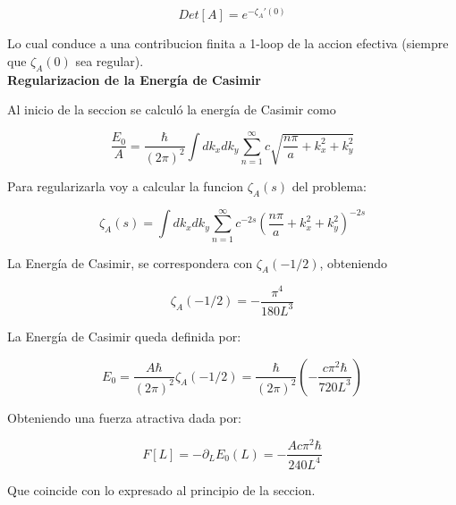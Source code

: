 \begin{equation}
Det[A] = e ^{- \zeta _A ' (0)}
\end{equation}

Lo cual conduce a una contribucion finita a 1-loop de la accion efectiva (siempre que $\zeta _A (0)$ sea regular). \\

\textbf{Regularizacion de la Energía de Casimir}

Al inicio de la seccion se calculó la energía de Casimir como

\begin{equation}
\frac{E _0}{A} = \frac{\hbar }{(2 \pi) ^2} \int dk _x dk _y 
\sum _{n=1} ^{\infty} 
c
\sqrt{
		\frac{n \pi}{a } + k _x ^2 + k _y ^2
		}
\end{equation}

Para regularizarla voy a calcular la funcion $\zeta _A (s)$ del problema:

\begin{equation}
\zeta _A (s) = 
\int dk _x dk _y 
\sum _{n=1} ^{\infty} 
c ^{-2s}
\left(	\frac{n \pi}{a } + k _x ^2 + k _y ^2
		\right) ^{-2s}
\end{equation}

La Energía de Casimir, se correspondera con $\zeta _A (-1/2)$, obteniendo 


\begin{equation}
\zeta _A (-1/2) = 
- \frac{\pi ^4}{180 L ^3}
\end{equation}

La Energía de Casimir queda definida por:

\begin{equation}
E _0 =  \frac{A \hbar}{(2 \pi) ^2}
\zeta _A (-1/2) =
\frac{\hbar }{(2 \pi )^2} 
\left(
	- \frac{c \pi ^2 \hbar}{720 L ^3}
	\right)
\end{equation}

Obteniendo una fuerza atractiva dada por:

\begin{equation}
F[L] = - \partial _L E _0 (L) = 
- \frac{A c \pi ^2 \hbar}{240 L^4}
\end{equation}

Que coincide con lo expresado al principio de la seccion.